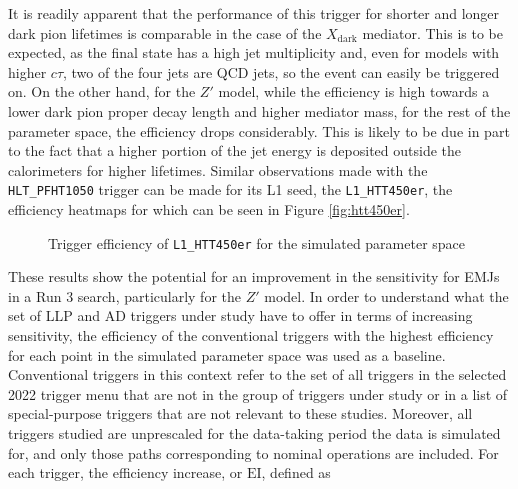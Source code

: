 It is readily apparent that the performance of this trigger for shorter and longer dark pion lifetimes is comparable in the case of the $X_{\text{dark}}$ mediator. This is to be expected, as the final state has a high jet multiplicity and, even for models with higher $c\tau$, two of the four jets are QCD jets, so the event can easily be triggered on. On the other hand, for the $Z'$ model, while the efficiency is high towards a lower dark pion proper decay length and higher mediator mass, for the rest of the parameter space, the efficiency drops considerably. This is likely to be due in part to the fact that a higher portion of the jet energy is deposited outside the calorimeters for higher lifetimes. Similar observations made with the \texttt{HLT\_PFHT1050} trigger can be made for its L1 seed, the \texttt{L1\_HTT450er}, the efficiency heatmaps for which can be seen in Figure \ref{fig:htt450er}.

\begin{figure}[h]
    \centering
    \begin{subfigure}{0.45\textwidth}
        
    \end{subfigure}
    \hfill
    \begin{subfigure}{0.45\textwidth}
        
    \end{subfigure}
    \caption{Trigger efficiency of \texttt{L1\_HTT450er} for the simulated parameter space}
    \label{fig:ht1050}
\end{figure}

These results show the potential for an improvement in the sensitivity for EMJs in a Run 3 search, particularly for the $Z'$ model. In order to understand what the set of LLP and AD triggers under study have to offer in terms of increasing sensitivity, the efficiency of the conventional triggers with the highest efficiency for each point in the simulated parameter space was used as a baseline. Conventional triggers in this context refer to the set of all triggers in the selected 2022 trigger menu that are not in the group of triggers under study or in a list of special-purpose triggers that are not relevant to these studies. Moreover, all triggers studied are unprescaled for the data-taking period the data is simulated for, and only those paths corresponding to nominal operations are included. For each trigger, the efficiency increase, or $\text{EI}$, defined as

